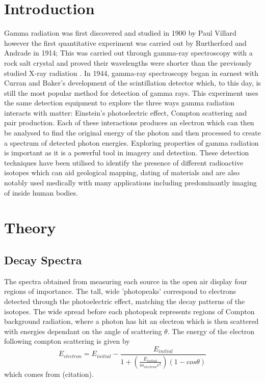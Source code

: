 \documentclass[11pt]{article} %
\begin{document}
\newpage %

\section{Introduction} 
\label{intro}
    Gamma radiation was first discovered and studied in 1900 by Paul Villard \cite{GammaRadiation} however the first quantitative experiment was carried out by Rurtherford and Andrade in 1914; This was carried out through gamma-ray spectroscopy with a rock salt crystal and proved their wavelengths were shorter than the previously studied X-ray radiation \cite{Rutherford1914}. In 1944, gamma-ray spectroscopy began in earnest with Curran and Baker’s development of the scintillation detector \cite{SD} which, to this day, is still the most popular method for detection of gamma rays. This experiment uses the same detection equipment to explore the three ways gamma radiation interacts with matter: Einstein’s photoelectric effect, Compton scattering and pair production. Each of these interactions produces an electron which can then be analysed to find the original energy of the photon and then processed to create a spectrum of detected photon energies. Exploring properties of gamma radiation is important as it is a powerful tool in imagery and detection. These detection techniques have been utilised to identify the presence of different radioactive isotopes which can aid geological mapping, dating of materials and are also notably used medically with many applications including predominantly imaging of inside human bodies.

\section{Theory}
    \subsection{Decay Spectra}
        The spectra obtained from measuring each source in the open air display four regions of importance. The tall, wide 'photopeaks' correspond to electrons detected through the photoelectric effect, matching the decay patterns of the isotopes. The wide spread before each photopeak represents regions of Compton background radiation, where a photon has hit an electron which is then scattered with energies dependant on the angle of scattering $\theta$. The energy of the electron following compton scattering is given by
        \begin{equation}\label{compton}
            E_{electron} = E_{initial}-\frac{E_{initial}}{1+(\frac{E_{initial}}{m_{electron}c^{2}})(1-cos\theta)}
        \end{equation}
        which comes from (citation).
\end{document}
